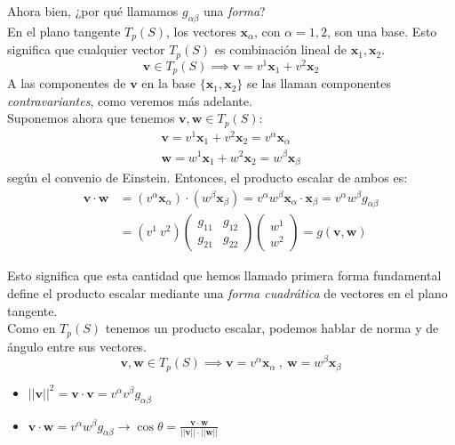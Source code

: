Ahora bien, ¿por qué llamamos $g_{\alpha\beta}$ una \emph{forma}?\\

En el plano tangente $T_p(S)$, los vectores $\mathbf{x}_\alpha$, con $\alpha=1,2$, son una base. Esto significa que cualquier vector $T_p(S)$ es combinación lineal de $\mathbf{x}_1,\mathbf{x}_2$.
$$
\mathbf{v}\in T_p(S)\implies \mathbf{v}=v^1\mathbf{x}_1+v^2\mathbf{x}_2
$$
A las componentes de $\mathbf{v}$ en la base $\{ \mathbf{x}_1,\mathbf{x}_2 \}$ se las llaman componentes \emph{contravariantes}, como veremos más adelante.\\

Suponemos ahora que tenemos $\mathbf{v,w}\in T_p(S)$:
\begin{gather*}
    \mathbf{v}=v^1\mathbf{x}_1+v^2\mathbf{x}_2=v^\alpha \mathbf{x}_\alpha\\
    \mathbf{w}=w^1\mathbf{x}_1+w^2\mathbf{x}_2=w^\beta \mathbf{x}_\beta
\end{gather*}
según el convenio de Einstein. Entonces, el producto escalar de ambos es:
\begin{equation*}
    \begin{split}
        \mathbf{v\cdot w}&=(v^\alpha \mathbf{x}_\alpha)\cdot (w^\beta \mathbf{x}_\beta)=v^\alpha w^\beta  \mathbf{x}_\alpha\cdot\mathbf{x}_\beta=v^\alpha w^\beta g_{\alpha\beta}\\ 
                     &=(v^1 \ v^2)\left ( 
                     \begin{array}{cc}
                          g_{11}&g_{12}  \\
                          g_{21}&g_{22} 
                     \end{array}
                     \right ) \left ( \begin{array}{c}
                          w^1  \\
                          w^2 
                     \end{array} \right )=g(\mathbf{v,w})
    \end{split}
\end{equation*}

Esto significa que esta cantidad que hemos llamado primera forma fundamental define el producto escalar mediante una \emph{forma cuadrática} de vectores en el plano tangente.\\

Como en $T_p(S)$ tenemos un producto escalar, podemos hablar de norma y de ángulo entre sus vectores.
$$
\mathbf{v,w}\in T_p(S)\implies \mathbf{v}=v^\alpha \mathbf{x}_\alpha \ , \ \mathbf{w}=w^\beta \mathbf{x}_\beta
$$
\begin{itemize}
    \item $||\mathbf{v}||^2=\mathbf{v}\cdot \mathbf{v}=v^\alpha v^\beta g_{\alpha\beta}$
    \item $\mathbf{v\cdot w}=v^\alpha w^\beta g_{\alpha \beta} \longrightarrow \cos \theta=\frac{\mathbf{v\cdot w}}{||\mathbf{v}||\cdot ||\mathbf{w}||}$
\end{itemize}

